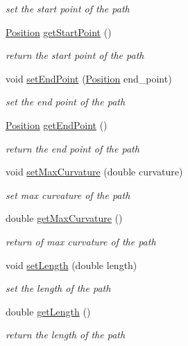 \begin{DoxyCompactItemize}
\begin{DoxyCompactList}\small\item\em set the start point of the path \end{DoxyCompactList}\item 
\mbox{\hyperlink{class_position}{Position}} \mbox{\hyperlink{class_path_a88e537e6bfe6140d00b0f36ca642a4cd}{get\+Start\+Point}} ()
\begin{DoxyCompactList}\small\item\em return the start point of the path \end{DoxyCompactList}\item 
void \mbox{\hyperlink{class_path_a168f515818fd9b26a6264fdf95af52e8}{set\+End\+Point}} (\mbox{\hyperlink{class_position}{Position}} end\+\_\+point)
\begin{DoxyCompactList}\small\item\em set the end point of the path \end{DoxyCompactList}\item 
\mbox{\hyperlink{class_position}{Position}} \mbox{\hyperlink{class_path_ac2617080c944b93f7c0c63f3e59aa88c}{get\+End\+Point}} ()
\begin{DoxyCompactList}\small\item\em return the end point of the path \end{DoxyCompactList}\item 
void \mbox{\hyperlink{class_path_a132d54dc6350d1c2eb86611db60df7ff}{set\+Max\+Curvature}} (double curvature)
\begin{DoxyCompactList}\small\item\em set max curvature of the path \end{DoxyCompactList}\item 
double \mbox{\hyperlink{class_path_a613552d171c766462f422593b4957ecc}{get\+Max\+Curvature}} ()
\begin{DoxyCompactList}\small\item\em return of max curvature of the path \end{DoxyCompactList}\item 
void \mbox{\hyperlink{class_path_ad723ba990a07d7542703770a09df52a7}{set\+Length}} (double length)
\begin{DoxyCompactList}\small\item\em set the length of the path \end{DoxyCompactList}\item 
double \mbox{\hyperlink{class_path_ad497d2a12a47bc52a316da83dbe6acbc}{get\+Length}} ()
\begin{DoxyCompactList}\small\item\em return the length of the path \end{DoxyCompactList}\end{DoxyCompactItemize}
